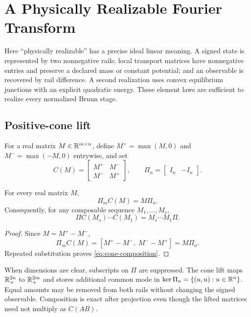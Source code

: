 \section{A Physically Realizable Fourier Transform}
\label{sec:physical}

Here ``physically realizable'' has a precise ideal linear meaning.  A signed
state is represented by two nonnegative rails; local transport matrices have
nonnegative entries and preserve a declared mass or constant potential; and an
observable is recovered by rail difference.  A second realization uses convex
equilibrium junctions with an explicit quadratic energy.  These element laws
are sufficient to realize every normalized Bruun stage.

\subsection{Positive-cone lift}

For a real matrix $M\in\mathbb{R}^{m\times n}$, define $M^+=\max(M,0)$ and
$M^-=\max(-M,0)$ entrywise, and set
\begin{equation}
 C(M)=\begin{bmatrix}M^+&M^-\\M^-&M^+\end{bmatrix},
 \qquad
 \Pi_n=\begin{bmatrix}I_n&-I_n\end{bmatrix}.
 \label{eq:cone-lift}
\end{equation}

\begin{theorem}
For every real matrix $M$,
\begin{equation}
 \Pi_m C(M)=M\Pi_n.
 \label{eq:cone-intertwining}
\end{equation}
Consequently, for any composable sequence $M_1,\ldots,M_s$,
\begin{equation}
 \Pi C(M_s)\cdots C(M_1)=M_s\cdots M_1\Pi.
 \label{eq:cone-composition}
\end{equation}
\end{theorem}
\begin{proof}
Since $M=M^+-M^-$,
\[
 \Pi_m C(M)=[M^+-M^-,\;M^--M^+]=M\Pi_n.
\]
Repeated substitution proves \eqref{eq:cone-composition}.
\end{proof}

When dimensions are clear, subscripts on $\Pi$ are suppressed.  The cone lift
maps $\mathbb{R}_+^{2n}$ to $\mathbb{R}_+^{2m}$ and stores additional common mode in
$\ker\Pi_n=\{(u,u):u\in\mathbb{R}^n\}$.  Equal
amounts may be removed from both rails without changing the signed observable.
Composition is exact after projection even though the lifted matrices need not
multiply as $C(AB)$.

